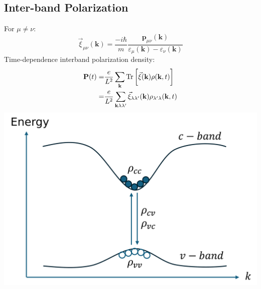 \documentclass{beamer}
\begin{document}
\subsection{Inter-band Polarization}
\begin{frame}
		\begin{multicols}{2}
For $\mu \neq \nu$:
			\begin{equation}
\vec{\xi}_{\mu\nu}(\textbf{k}) = \frac{-i\hbar}{m}\frac{\textbf{p}_{\mu\nu}(\textbf{k})}{\varepsilon_{\mu}(\textbf{k}) - \varepsilon_{\nu}(\textbf{k})}
			\end{equation}
Time-dependence interband polarization density:
	\begin{align}
		\textbf{P}(t) = &\frac{e}{L^2} \sum_{\textbf{k}} \Tr\bigg[\vec{\xi}(\textbf{k})\rho(\textbf{k},t)\bigg]\nonumber\\
		= &\frac{e}{L^2} \sum_{\textbf{k}\lambda\lambda'}\vec{\xi}_{\lambda\lambda'}(\textbf{k})\rho_{\lambda'\lambda}(\textbf{k},t)
	\end{align}
			\columnbreak
			\includegraphics[width=0.8\linewidth]{images/cvbeamer.pdf}
		\end{multicols}
	\end{frame}
\end{document}
